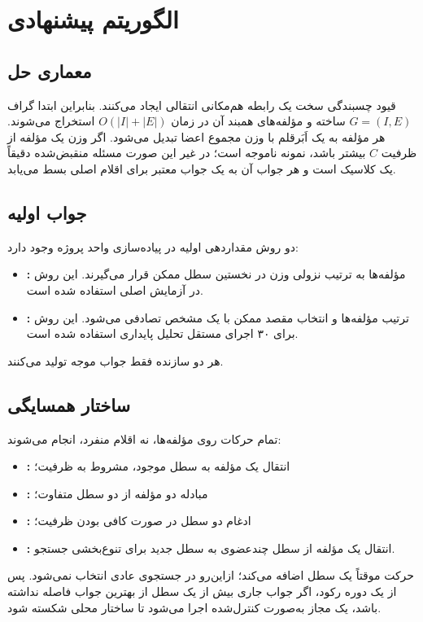 \section{الگوریتم پیشنهادی}

\subsection{معماری حل}
قیود چسبندگی سخت یک رابطه هم‌مکانی انتقالی ایجاد می‌کنند. بنابراین ابتدا گراف
$G=(I,E)$ ساخته و مؤلفه‌های همبند آن در زمان $O(|I|+|E|)$ استخراج می‌شوند.
هر مؤلفه به یک اَبَرقلم با وزن مجموع اعضا تبدیل می‌شود. اگر وزن یک مؤلفه از
ظرفیت $C$ بیشتر باشد، نمونه ناموجه است؛ در غیر این صورت مسئله منقبض‌شده دقیقاً
یک  کلاسیک است و هر جواب آن به یک جواب معتبر برای اقلام اصلی بسط
می‌یابد.

\subsection{جواب اولیه}
دو روش مقداردهی اولیه در پیاده‌سازی واحد پروژه وجود دارد:
\begin{itemize}
  \item \textbf{:} مؤلفه‌ها به ترتیب نزولی وزن در نخستین سطل ممکن قرار
  می‌گیرند. این روش در آزمایش اصلی استفاده شده است.
  \item \textbf{:} ترتیب مؤلفه‌ها و انتخاب مقصد ممکن
  با یک  مشخص تصادفی می‌شود. این روش برای ۳۰ اجرای مستقل تحلیل
  پایداری استفاده شده است.
\end{itemize}
هر دو سازنده فقط جواب موجه تولید می‌کنند.

\subsection{ساختار همسایگی}
تمام حرکات روی مؤلفه‌ها، نه اقلام منفرد، انجام می‌شوند:
\begin{itemize}
  \item \textbf{:} انتقال یک مؤلفه به سطل موجود، مشروط به ظرفیت؛
  \item \textbf{:} مبادله دو مؤلفه از دو سطل متفاوت؛
  \item \textbf{:} ادغام دو سطل در صورت کافی بودن ظرفیت؛
  \item \textbf{:} انتقال یک مؤلفه از سطل چندعضوی به سطل جدید برای
  تنوع‌بخشی جستجو.
\end{itemize}
حرکت  موقتاً یک سطل اضافه می‌کند؛ ازاین‌رو در جستجوی عادی انتخاب
نمی‌شود. پس از یک دوره رکود، اگر جواب جاری بیش از یک سطل از بهترین جواب فاصله
نداشته باشد، یک  مجاز به‌صورت کنترل‌شده اجرا می‌شود تا ساختار محلی
شکسته شود.


